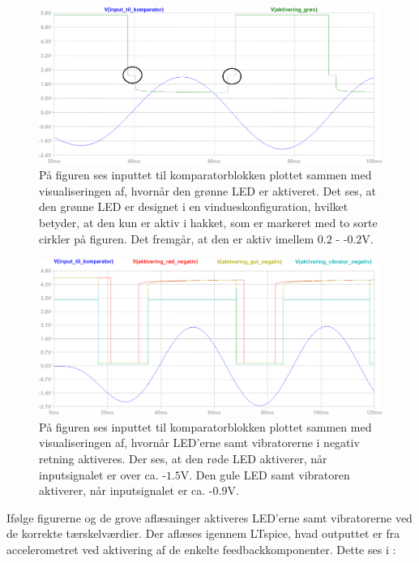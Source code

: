 \begin{figure}[H]
	\centering
	\includegraphics[scale=.38]{figures/cProblemloesning/Samlet_system_sim5.PNG}
	\caption{På figuren ses inputtet til komparatorblokken plottet sammen med visualiseringen af, hvornår den grønne LED er aktiveret. Det ses, at den grønne LED er designet i en vindueskonfiguration, hvilket betyder, at den kun er aktiv i hakket, som er markeret med to sorte cirkler på figuren. Det fremgår, at den er aktiv imellem $0.2$ - -$0.2$V.}
	\label{fig:samlet_system_sim5}
\end{figure}
\begin{figure}[H]
	\centering
	\includegraphics[scale=.38]{figures/cProblemloesning/Samlet_system_sim4.PNG}
	\caption{På figuren ses inputtet til komparatorblokken plottet sammen med visualiseringen af, hvornår LED'erne samt vibratorerne i negativ retning aktiveres. Der ses, at den røde LED aktiverer, når inputsignalet er over ca. -$1.5$V. Den gule LED samt vibratoren aktiverer, når inputsignalet er ca. -$0.9$V.}
	\label{fig:samlet_system_sim3}
\end{figure}
\noindent Ifølge figurerne og de grove aflæsninger aktiveres LED'erne samt vibratorerne ved de korrekte tærskelværdier. Der aflæses igennem LTspice, hvad outputtet er fra accelerometret ved aktivering af de enkelte feedbackkomponenter. Dette ses i :
